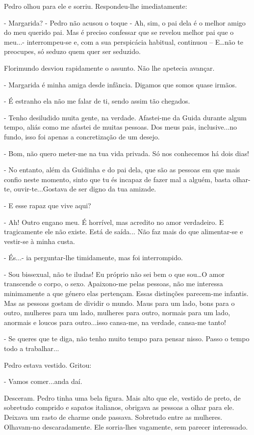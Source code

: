 Pedro olhou para ele e sorriu. Respondeu-lhe imediatamente:

- Margarida? - Pedro não acusou o toque - Ah, sim, o pai dela é o melhor
amigo do meu querido pai. Mas é preciso confessar que se revelou melhor
pai que o meu...- interrompeu-se e, com a sua perspicácia habitual,
continuou -- E\ldots{}não te preocupes, só seduzo quem quer ser
seduzido.

Florimundo desviou rapidamente o assunto. Não lhe apetecia avançar.

- Margarida é minha amiga desde infância. Digamos que somos quase
irmãos.

- É estranho ela não me falar de ti, sendo assim tão chegados.

- Tenho desiludido muita gente, na verdade. Afastei-me da Guida durante
algum tempo, aliás como me afastei de muitas pessoas. Dos meus pais,
inclusive...no fundo, isso foi apenas a concretização de um desejo.

- Bom, não quero meter-me na tua vida privada. Só nos conhecemos há dois
dias!

- No entanto, além da Guidinha e do pai dela, que são as pessoas em que
mais confio neste momento, sinto que tu és incapaz de fazer mal a
alguém, basta olhar-te, ouvir-te...Gostava de ser digno da tua amizade.

- E esse rapaz que vive aqui?

- Ah! Outro engano meu. É horrível, mas acredito no amor verdadeiro. E
tragicamente ele não existe. Está de saída... Não faz mais do que
alimentar-se e vestir-se à minha custa.

- És...- ia perguntar-lhe timidamente, mas foi interrompido.

- Sou bissexual, não te iludas! Eu próprio não sei bem o que
sou\ldots{}O amor transcende o corpo, o sexo. Apaixono-me pelas pessoas,
não me interessa minimamente a que género elas pertençam. Essas
distinções parecem-me infantis. Mas as pessoas gostam de dividir o
mundo. Maus para um lado, bons para o outro, mulheres para um lado,
mulheres para outro, normais para um lado, anormais e loucos para
outro...isso cansa-me, na verdade, cansa-me tanto!

- Se queres que te diga, não tenho muito tempo para pensar nisso. Passo
o tempo todo a trabalhar...

Pedro estava vestido. Gritou:

- Vamos comer...anda daí.

Desceram. Pedro tinha uma bela figura. Mais alto que ele, vestido de
preto, de sobretudo comprido e sapatos italianos, obrigava as pessoas a
olhar para ele. Deixava um rasto de charme onde passava. Sobretudo entre
as mulheres. Olhavam-no descaradamente. Ele sorria-lhes vagamente, sem
parecer interessado.

